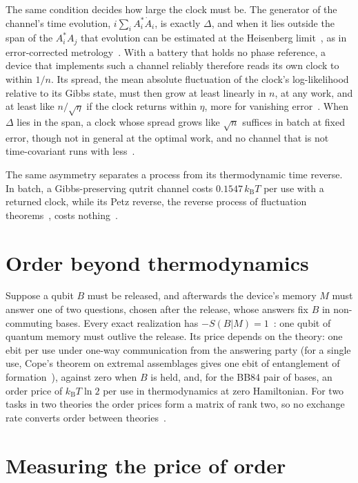 \documentclass[11pt]{article}
\newcommand{\kB}{k_{\mathrm B}}
\begin{document}
The same condition decides how large the clock must be. The generator of the channel's time evolution, $i\sum_iA_i^*\dot A_i$, is exactly $\Delta$, and when it lies outside the span of the $A_i^*A_j$ that evolution can be estimated at the Heisenberg limit~\cite{ZhouJiang21}, as in error-corrected metrology~\cite{DemkowiczCzajkowskiSekatski17,ZhouZhangPreskillJiang18}. With a battery that holds no phase reference, a device that implements such a channel reliably therefore reads its own clock to within $1/n$. Its spread, the mean absolute fluctuation of the clock's log-likelihood relative to its Gibbs state, must then grow at least linearly in $n$, at any work, and at least like $n/\sqrt\eta$ if the clock returns within $\eta$, more for vanishing error~\cite[Prop.~8]{KeepingTime}. When $\Delta$ lies in the span, a clock whose spread grows like $\sqrt n$ suffices in batch at fixed error, though not in general at the optimal work, and no channel that is not time-covariant runs with less~\cite[Prop.~9]{KeepingTime}.

The same asymmetry separates a process from its thermodynamic time reverse. In batch, a Gibbs-preserving qutrit channel costs $0.1547\,\kB T$ per use with a returned clock, while its Petz reverse, the reverse process of fluctuation theorems~\cite{Crooks08}, costs nothing~\cite[Prop.~14]{KeepingTime}.

\section*{Order beyond thermodynamics}
Suppose a qubit $B$ must be released, and afterwards the device's memory $M$ must answer one of two questions, chosen after the release, whose answers fix $B$ in non-commuting bases. Every exact realization has $-S(B|M)=1$~\cite[Lemma~5]{Order}: one qubit of quantum memory must outlive the release. Its price depends on the theory: one ebit per use under one-way communication from the answering party (for a single use, Cope's theorem on extremal assemblages gives one ebit of entanglement of formation~\cite{Cope21}), against zero when $B$ is held, and, for the BB84 pair of bases, an order price of $\kB T\ln2$ per use in thermodynamics at zero Hamiltonian. For two tasks in two theories the order prices form a matrix of rank two, so no exchange rate converts order between theories~\cite[Sec.~7]{Order}.

\section*{Measuring the price of order}
\end{document}

